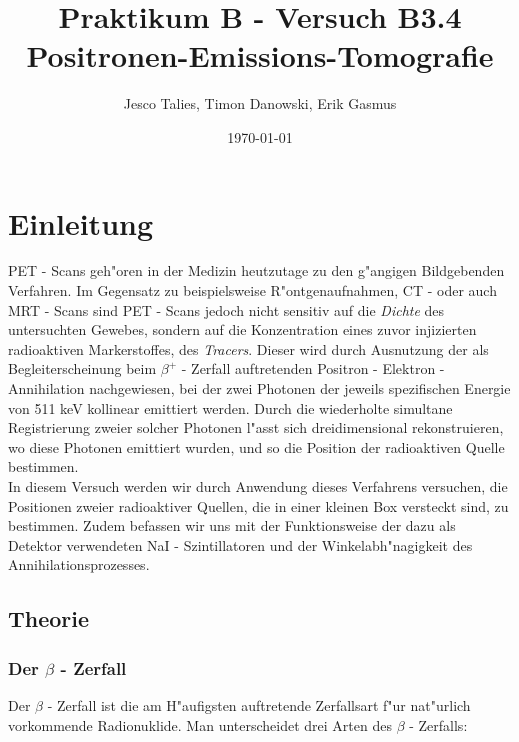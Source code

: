 \documentclass{article}
\begin{document}
    \title{Praktikum B - Versuch B3.4 Positronen-Emissions-Tomografie}
    \date{\today}
    \author{Jesco Talies, Timon Danowski, Erik Gasmus}
    \maketitle
    \newpage

    \tableofcontents
    \newpage

\section{Einleitung}

PET - Scans geh"oren in der Medizin heutzutage zu den g"angigen Bildgebenden Verfahren. Im Gegensatz zu beispielsweise R"ontgenaufnahmen, CT - oder auch MRT - Scans sind PET -  Scans jedoch nicht sensitiv auf die \textit{Dichte} des untersuchten Gewebes, sondern auf die Konzentration eines zuvor injizierten radioaktiven Markerstoffes, des \textit{Tracers}. Dieser wird durch Ausnutzung der als Begleiterscheinung beim $\beta^+$ - Zerfall auftretenden Positron - Elektron - Annihilation nachgewiesen, bei der zwei Photonen der jeweils spezifischen Energie von 511 keV kollinear emittiert werden. Durch die wiederholte simultane Registrierung zweier solcher Photonen l"asst sich dreidimensional rekonstruieren, wo diese Photonen emittiert wurden, und so die Position der radioaktiven Quelle bestimmen. \\
In diesem Versuch werden wir durch Anwendung dieses Verfahrens versuchen, die Positionen zweier radioaktiver Quellen, die in einer kleinen Box versteckt sind, zu bestimmen. Zudem befassen wir uns mit der Funktionsweise der dazu als Detektor verwendeten NaI - Szintillatoren und der Winkelabh"nagigkeit des Annihilationsprozesses.


\subsection{Theorie}


\subsubsection{Der $\beta$ - Zerfall}


Der $\beta$ - Zerfall ist die am H"aufigsten auftretende Zerfallsart f"ur nat"urlich vorkommende Radionuklide. Man unterscheidet drei Arten des $\beta$ - Zerfalls:
\end{document}
